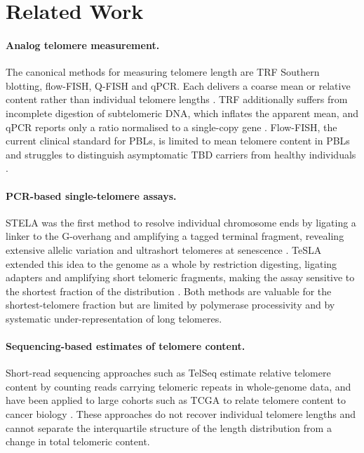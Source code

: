 \section{Related Work}

\paragraph{Analog telomere measurement.} The canonical methods for measuring telomere length are TRF Southern blotting, flow-FISH, Q-FISH and qPCR. Each delivers a coarse mean or relative content rather than individual telomere lengths \cite{aubert2012telomere,baerlocher2006flow,cawthon2002telomere,lai2017comparison}. TRF additionally suffers from incomplete digestion of subtelomeric DNA, which inflates the apparent mean, and qPCR reports only a ratio normalised to a single-copy gene \cite{cawthon2002telomere}. Flow-FISH, the current clinical standard for PBLs, is limited to mean telomere content in PBLs and struggles to distinguish asymptomatic TBD carriers from healthy individuals \cite{alder2018diagnostic}.

\paragraph{PCR-based single-telomere assays.} STELA was the first method to resolve individual chromosome ends by ligating a linker to the G-overhang and amplifying a tagged terminal fragment, revealing extensive allelic variation and ultrashort telomeres at senescence \cite{baird2003extensive}. TeSLA extended this idea to the genome as a whole by restriction digesting, ligating adapters and amplifying short telomeric fragments, making the assay sensitive to the shortest fraction of the distribution \cite{lai2018comparison}. Both methods are valuable for the shortest-telomere fraction but are limited by polymerase processivity and by systematic under-representation of long telomeres.

\paragraph{Sequencing-based estimates of telomere content.} Short-read sequencing approaches such as TelSeq estimate relative telomere content by counting reads carrying telomeric repeats in whole-genome data, and have been applied to large cohorts such as TCGA to relate telomere content to cancer biology \cite{ding2014telseq,barthel2017systematic,demanelis2020determinants}. These approaches do not recover individual telomere lengths and cannot separate the interquartile structure of the length distribution from a change in total telomeric content.

